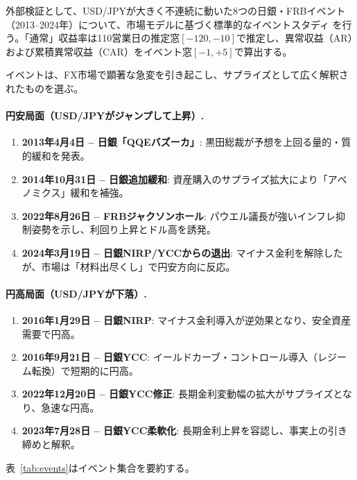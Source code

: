\documentclass[12pt,a4paper]{article}
\begin{document}
外部検証として、USD/JPYが大きく不連続に動いた8つの日銀・FRBイベント（2013--2024年）について、市場モデルに基づく標準的なイベントスタディ \citep{mackinlay1997} を行う。「通常」収益率は110営業日の推定窓$[-120,-10]$で推定し、異常収益（AR）および累積異常収益（CAR）をイベント窓$[-1,+5]$で算出する。

イベントは、FX市場で顕著な急変を引き起こし、サプライズとして広く解釈されたものを選ぶ。

\paragraph{円安局面（USD/JPYがジャンプして上昇）.}
\begin{enumerate}
\item \textbf{2013年4月4日 -- 日銀「QQEバズーカ」}: 黒田総裁が予想を上回る量的・質的緩和を発表。
\item \textbf{2014年10月31日 -- 日銀追加緩和}: 資産購入のサプライズ拡大により「アベノミクス」緩和を補強。
\item \textbf{2022年8月26日 -- FRBジャクソンホール}: パウエル議長が強いインフレ抑制姿勢を示し、利回り上昇とドル高を誘発。
\item \textbf{2024年3月19日 -- 日銀NIRP/YCCからの退出}: マイナス金利を解除したが、市場は「材料出尽くし」で円安方向に反応。
\end{enumerate}

\paragraph{円高局面（USD/JPYが下落）.}
\begin{enumerate}
\item \textbf{2016年1月29日 -- 日銀NIRP}: マイナス金利導入が逆効果となり、安全資産需要で円高。
\item \textbf{2016年9月21日 -- 日銀YCC}: イールドカーブ・コントロール導入（レジーム転換）で短期的に円高。
\item \textbf{2022年12月20日 -- 日銀YCC修正}: 長期金利変動幅の拡大がサプライズとなり、急速な円高。
\item \textbf{2023年7月28日 -- 日銀YCC柔軟化}: 長期金利上昇を容認し、事実上の引き締めと解釈。
\end{enumerate}

表~\ref{tab:events}はイベント集合を要約する。
\end{document}
